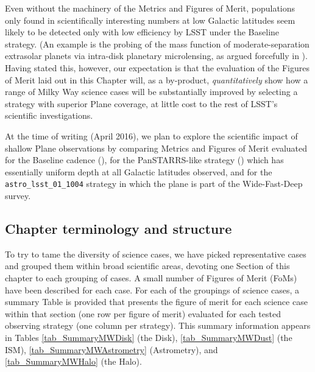     Even without the machinery of the Metrics and Figures
  of Merit, populations only found in scientifically interesting
  numbers at low Galactic latitudes seem likely to be detected only
  with low efficiency by LSST under the Baseline strategy. (An example
  is the probing of the mass function of moderate-separation
  extrasolar planets via intra-disk planetary microlensing, as argued
  forcefully in \citet{gould13}). Having stated this,
  however, our expectation is that the evaluation of the Figures of
  Merit laid out in this Chapter will, as a by-product, {\it
    quantitatively} show how a range of Milky Way science cases will
  be substantially improved by selecting a strategy with superior
  Plane coverage, at little cost to the rest of LSST's scientific
  investigations.

At the time of writing (April 2016), we plan to explore the scientific
  impact of shallow Plane observations by comparing Metrics and
  Figures of Merit evaluated for the Baseline cadence
  (), for the PanSTARRS-like strategy
  () which has essentially uniform depth at all Galactic latitudes observed, 
  and for the {\tt astro\_lsst\_01\_1004} strategy in which the plane is part of the Wide-Fast-Deep survey.

\subsection{Chapter terminology and structure}

To try to tame the diversity of science cases, we have picked
representative cases and grouped them within broad scientific areas,
devoting one Section of this chapter to each grouping of cases. A
small number of Figures of Merit (FoMs) have been described for each
case. For each of the groupings of science cases, a summary Table is
provided that presents the figure of merit for each science case
within that section (one row per figure of merit) evaluated for each
tested observing strategy (one column per strategy). This summary
information appears in Tables \ref{tab_SummaryMWDisk} (the Disk), \ref{tab_SummaryMWDust} (the ISM), \ref{tab_SummaryMWAstrometry} (Astrometry), and \ref{tab_SummaryMWHalo} (the Halo).

